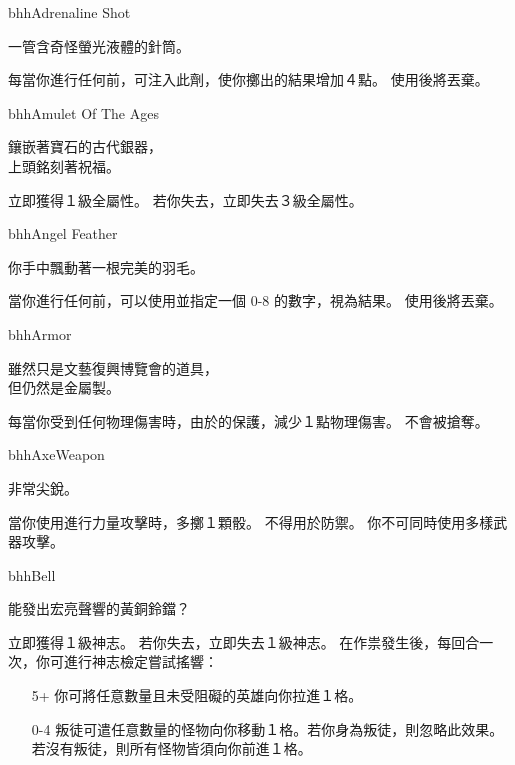 %
\begin{ItemCard}{bhh}{Adrenaline Shot}{}
	\begin{CardStory}
		一管含奇怪螢光液體的針筒。
	\end{CardStory}
	每當你進行任何前，可注入此劑，使你擲出的結果增加４點。 \smallbreak
	使用後將\ThisName{}丟棄。\smallbreak
\end{ItemCard}%
\linebreak[0]%
\begin{ItemCard}{bhh}{Amulet Of The Ages}{}
	\begin{CardStory}
		鑲嵌著寶石的古代銀器，\\
		上頭銘刻著祝福。
	\end{CardStory}
	立即獲得１級全屬性。\smallbreak
	若你失去\ThisName{}，立即失去３級全屬性。\smallbreak
\end{ItemCard}%
\linebreak[0]%
\begin{ItemCard}{bhh}{Angel Feather}{}
	\begin{CardStory}
		你手中飄動著一根完美的羽毛。
	\end{CardStory}
	當你進行任何\RollAny{}前，可以使用\ThisName{}並指定一個 0-8 的數字，視為\RollAny{}結果。\smallbreak
	使用後將\ThisName{}丟棄。\smallbreak
\end{ItemCard}%
\linebreak[0]%
\begin{ItemCard}{bhh}{Armor}{}
	\begin{CardStory}
		雖然只是文藝復興博覽會的道具，\\
		但仍然是金屬製。
	\end{CardStory}
	每當你受到任何物理傷害時，由於\ThisName{}的保護，減少１點物理傷害。\smallbreak
	\ThisName{}不會被搶奪。\smallbreak
\end{ItemCard}%
\linebreak[0]%
\begin{ItemCard}{bhh}{Axe}{Weapon}
	\begin{CardStory}
		非常尖銳。
	\end{CardStory}
	當你使用\ThisName{}進行力量攻擊時，多擲１顆骰。\smallbreak
	\ThisName{}不得用於防禦。\smallbreak
	你不可同時使用多樣武器攻擊。\smallbreak
\end{ItemCard}%
\linebreak[0]%
\begin{ItemCard}{bhh}{Bell}{}
	\begin{CardStory}
		能發出宏亮聲響的黃銅鈴鐺？
	\end{CardStory}
	立即獲得１級神志。\smallbreak
	若你失去\ThisName{}，立即失去１級神志。\smallbreak
	在作祟發生後，每回合一次，你可進行神志檢定嘗試搖響\ThisName{}：
	\begin{itemize}
		\item[5+] 你可將任意數量且未受阻礙的英雄向你拉進１格。
		\item[0-4] 叛徒可遣任意數量的怪物向你移動１格。若你身為叛徒，則忽略此效果。若沒有叛徒，則所有怪物皆須向你前進１格。
	\end{itemize}
\end{ItemCard}%
